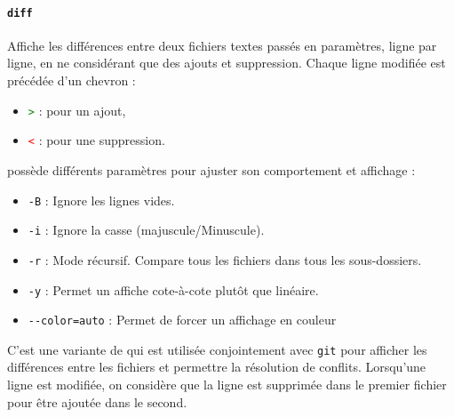 \paragraph{\texttt{diff}} 
Affiche les différences entre deux fichiers textes passés en paramètres, ligne par ligne, en ne considérant que des ajouts et suppression. Chaque ligne modifiée est précédée d'un chevron :
\begin{itemize}
    \item \textcolor{green}{\texttt{>}} : pour un ajout,
    \item \textcolor{red}{\texttt{<}} : pour une suppression.
\end{itemize}
 possède différents paramètres pour ajuster son comportement et affichage :
\begin{itemize}
    \item \texttt{-B} : Ignore les lignes vides.
    \item \texttt{-i} : Ignore la casse (majuscule/Minuscule).
    \item \texttt{-r} : Mode récursif. Compare tous les fichiers dans tous les sous-dossiers.
    \item \texttt{-y} : Permet un affiche cote-à-cote plutôt que linéaire.
    \item \texttt{-{}-color=auto} : Permet de forcer un affichage en couleur
\end{itemize}
\vspace{5mm}

 C'est une variante de  qui est utilisée conjointement avec \texttt{git} pour afficher les différences entre les fichiers et permettre la résolution de conflits. Lorsqu'une ligne est modifiée, on considère que la ligne est supprimée dans le premier fichier pour être ajoutée dans le second.